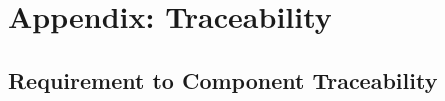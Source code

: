 
\newpage
\section{Appendix: Traceability}\label{appendix-traceability}

\subsection{Requirement to Component
Traceability}\label{requirement-to-component-traceability}

\footnotesize
{}

